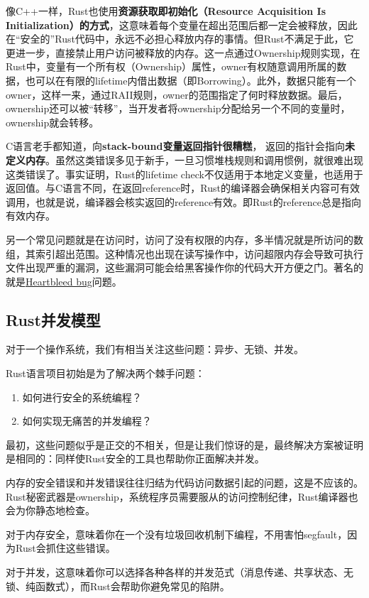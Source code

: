 \documentclass[12pt, a4paper]{article}
\begin{document}
	像C++一样，Rust也使用\textbf{资源获取即初始化（Resource Acquisition Is Initialization）的方式}，这意味着每个变量在超出范围后都一定会被释放，因此在“安全的”Rust代码中，永远不必担心释放内存的事情。但Rust不满足于此，它更进一步，直接禁止用户访问被释放的内存。这一点通过Ownership规则实现，在Rust中，变量有一个所有权（Ownership）属性，owner有权随意调用所属的数据，也可以在有限的lifetime内借出数据（即Borrowing）。此外，数据只能有一个owner，这样一来，通过RAII规则，owner的范围指定了何时释放数据。最后，ownership还可以被“转移”，当开发者将ownership分配给另一个不同的变量时，ownership就会转移。
	
	C语言老手都知道，向\textbf{stack-bound变量返回指针很糟糕}， 返回的指针会指向\textbf{未定义内存}。虽然这类错误多见于新手，一旦习惯堆栈规则和调用惯例，就很难出现这类错误了。事实证明，Rust的lifetime check不仅适用于本地定义变量，也适用于返回值。与C语言不同，在返回reference时，Rust的编译器会确保相关内容可有效调用，也就是说，编译器会核实返回的reference有效。即Rust的reference总是指向有效内存。
	
	另一个常见问题就是在访问时，访问了没有权限的内存，多半情况就是所访问的数组，其索引超出范围。这种情况也出现在读写操作中，访问超限内存会导致可执行文件出现严重的漏洞，这些漏洞可能会给黑客操作你的代码大开方便之门。著名的就是\href{https://tonyarcieri.com/would-rust-have-prevented-heartbleed-another-look}{Heartbleed bug}问题。
	
	\subsection{Rust并发模型}
	对于一个操作系统，我们有相当关注这些问题：异步、无锁、并发。
	
	Rust语言项目初始是为了解决两个棘手问题：
	\begin{enumerate}
	\item 如何进行安全的系统编程？
	
	\item 如何实现无痛苦的并发编程？
	\end{enumerate}
	最初，这些问题似乎是正交的不相关，但是让我们惊讶的是，最终解决方案被证明是相同的：同样使Rust安全的工具也帮助你正面解决并发。
	
	内存的安全错误和并发错误往往归结为代码访问数据引起的问题，这是不应该的。Rust秘密武器是ownership，系统程序员需要服从的访问控制纪律，Rust编译器也会为你静态地检查。
	
	对于内存安全，意味着你在一个没有垃圾回收机制下编程，不用害怕segfault，因为Rust会抓住这些错误。
	
	对于并发，这意味着你可以选择各种各样的并发范式（消息传递、共享状态、无锁、纯函数式），而Rust会帮助你避免常见的陷阱。
	
\end{document}
